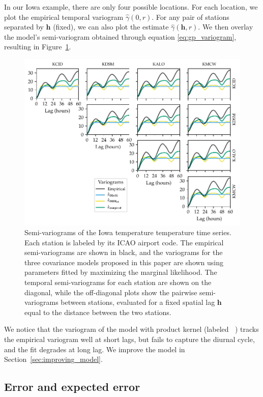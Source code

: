 \documentclass[letter]{article}
\makeatletter
\def\maxwidth{\ifdim\Gin@nat@width>\linewidth\linewidth
\else\Gin@nat@width\fi}
\let\Oldincludegraphics\includegraphics
\renewcommand{\includegraphics}[1]{\Oldincludegraphics[width=0.98\maxwidth]{#1}}
\newcommand{\genericdel}[3]{%
      \left#1#3\right#2
    }
\newcommand{\del}[1]{\genericdel(){#1}}
\newcommand{\hvec}{\mathbold{h}}
\DeclareMathOperator{\kSESE}{k_{\mathtt{SExSE}}}
\makeatother
\begin{document}
In our Iowa example, there are only four possible locations. For each location, we plot the empirical temporal variogram \(\widehat\gamma\del{0,r}\). For any pair of stations separated by \(\hvec\) (fixed), we can also plot the estimate \(\widehat\gamma\del{\hvec,r}\). We then overlay the model's semi-variogram obtained through equation \eqref{eq:gp_variogram}, resulting in Figure~\ref{fig:spatial_variogram}.

\begin{figure}
\centering
\includegraphics{../figures/spatial_variogram.pdf}
\caption{\label{fig:spatial_variogram}
Semi-variograms of the Iowa temperature temperature time series.
Each station is labeled by its ICAO airport code.
The empirical semi-variograms are shown in black, and the variograms for the three covariance models proposed in this paper are shown using parameters fitted by maximizing the marginal likelihood.
The temporal semi-variograms for each station are shown on the diagonal, while the off-diagonal plots show the pairwise semi-variograms between stations, evaluated for a fixed spatial lag \(\hvec\) equal to the distance between the two stations.
}
\end{figure}
    
        We notice that the variogram of the model with product kernel (labeled \(\kSESE\)) tracks the empirical variogram well at short lags, but fails to capture the diurnal cycle, and the fit degrades at long lag. We improve the model in Section~\ref{sec:improving_model}.

        \subsection{Error and expected error}\label{error-and-expected-error}
\end{document}
